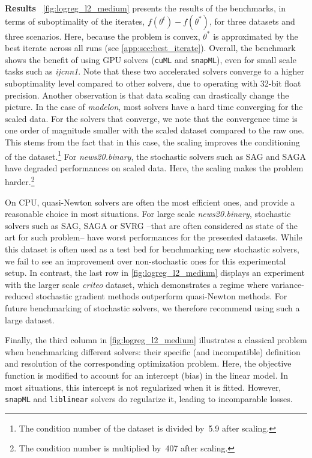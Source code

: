 \documentclass{article}
\newcommand{\cuML}{{{\texttt{cuML}}}}
\newcommand{\snapML}{{{\texttt{snapML}}}}
\newcommand{\liblinear}{{{\texttt{liblinear}}}}
\newcommand{\myparagraph}[1]{\vspace{1mm}\noindent\textbf{#1} \,}
\begin{document}
\myparagraph{Results}
\autoref{fig:logreg_l2_medium} presents the results of the benchmarks, in terms of suboptimality of the iterates, $f(\theta^t) - f(\theta^*)$, for three datasets and three scenarios.
Here, because the problem is convex, $\theta^*$ is approximated by the best iterate across all runs (see \autoref{app:sec:best_iterate}). Overall, the benchmark shows the benefit of using GPU solvers (\cuML{} and \snapML{}), even for small scale tasks such as \emph{ijcnn1}.
Note that these two accelerated solvers converge to a higher suboptimality level compared to other solvers, due to operating with 32-bit float precision.
Another observation is that data scaling can drastically change the picture.
In the case of \emph{madelon}, most solvers have a hard time converging for the scaled data. For the solvers that converge, we note that the convergence time is one order of magnitude smaller with the scaled dataset compared to the raw one. This stems from the fact that in this case, the scaling improves the conditioning of the dataset.\footnote{The condition number of the dataset is divided by~5.9 after scaling.}
For \emph{news20.binary}, the stochastic solvers such as SAG and SAGA have degraded performances on scaled data. Here, the scaling makes the problem harder.\footnote{The condition number is multiplied by~407 after scaling.}

On CPU, quasi-Newton solvers are often the most efficient ones, and provide a reasonable choice in most situations.
For large scale \emph{news20.binary}, stochastic solvers such as SAG, SAGA or SVRG --that are often considered as state of the art for such problem-- have worst performances for the presented datasets.
While this dataset is often used as a test bed for benchmarking new stochastic solvers, we fail to see an improvement over non-stochastic ones for this experimental setup.
In contrast, the last row in \autoref{fig:logreg_l2_medium} displays an experiment with the larger scale \emph{criteo} dataset, which demonstrates a regime where variance-reduced stochastic gradient methods outperform quasi-Newton methods. For future benchmarking of stochastic solvers, we therefore recommend using such a large dataset.

Finally, the third column in \autoref{fig:logreg_l2_medium} illustrates a classical problem when benchmarking different solvers: their specific (and incompatible) definition and resolution of the corresponding optimization problem.
Here, the objective function is modified to account for an intercept (bias) in the linear model.
In most situations, this intercept is not regularized when it is fitted. However, \snapML{} and \liblinear{} solvers do regularize it, leading to incomparable losses.
\end{document}
